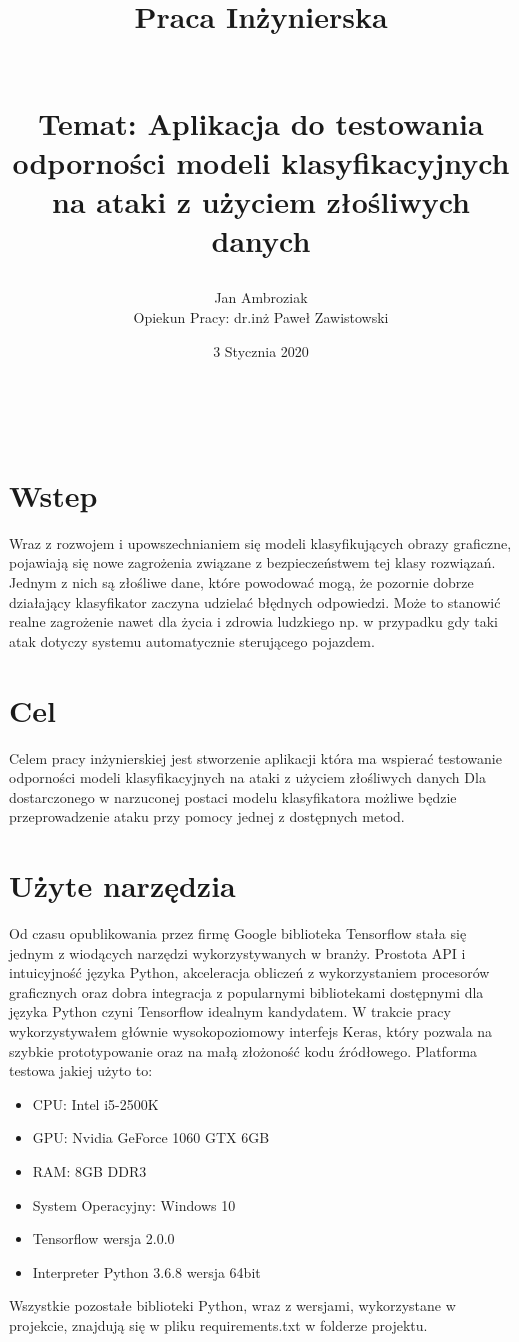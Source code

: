 \documentclass{article}
\title{
    Praca Inżynierska
    \begin{large}
    \\Temat: Aplikacja do testowania odporności
modeli klasyfikacyjnych na ataki z użyciem złośliwych danych
\end{large}}
\date{3 Stycznia 2020}
\author{Jan Ambroziak \\ Opiekun Pracy: dr.inż Paweł Zawistowski}
\begin{document}
    \maketitle

\

\section{Wstep}






Wraz z rozwojem i upowszechnianiem się modeli klasyfikujących obrazy graficzne,
pojawiają się nowe zagrożenia związane z bezpieczeństwem tej klasy rozwiązań.
Jednym z nich są złośliwe dane, które powodować mogą,
że pozornie dobrze działający klasyfikator zaczyna udzielać błędnych odpowiedzi.
Może to stanowić realne zagrożenie nawet dla życia i zdrowia ludzkiego
np. w przypadku gdy taki atak dotyczy systemu automatycznie sterującego pojazdem.

\section{Cel}
\label{sec:target}

Celem pracy inżynierskiej jest stworzenie aplikacji która ma wspierać testowanie
odporności modeli klasyfikacyjnych na ataki z użyciem złośliwych danych
Dla dostarczonego w narzuconej postaci modelu klasyfikatora możliwe będzie
przeprowadzenie ataku przy pomocy jednej z dostępnych metod.

\section{Użyte narzędzia}
Od czasu opublikowania przez firmę Google biblioteka Tensorflow 
stała się jednym z wiodących narzędzi wykorzystywanych w branży. Prostota API i intuicyjność
języka Python, akceleracja obliczeń z wykorzystaniem procesorów graficznych oraz dobra integracja z
popularnymi bibliotekami dostępnymi dla języka Python czyni Tensorflow idealnym kandydatem.
W trakcie pracy wykorzystywałem głównie wysokopoziomowy interfejs Keras, który pozwala na szybkie
prototypowanie oraz na małą złożoność kodu źródłowego.
Platforma testowa jakiej użyto to:
\begin{itemize}
    \item CPU: Intel i5-2500K
    \item GPU: Nvidia GeForce 1060 GTX 6GB
    \item RAM: 8GB DDR3
    \item System Operacyjny: Windows 10
    \item Tensorflow wersja 2.0.0
    \item Interpreter Python 3.6.8 wersja 64bit
\end{itemize}
Wszystkie pozostałe biblioteki Python, wraz z wersjami, wykorzystane w projekcie, znajdują się w pliku
requirements.txt w folderze projektu.
\end{document}
